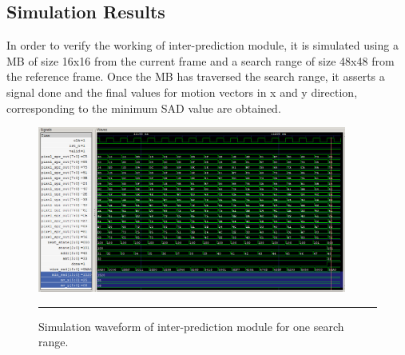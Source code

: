\subsection{Simulation Results}
In order to verify the working of inter-prediction module, it is simulated using a MB of size 16x16 from the current frame and a search range of size 48x48 from the reference frame. Once the MB has traversed the search range, it asserts a signal done and the final values for motion vectors in x and y direction, corresponding to the minimum SAD value are obtained. 
\begin{figure}[H]
	\centering
	\includegraphics[width = 4in]{./Figures/wave2.png}
	\rule{35em}{0.5pt}
	\caption{Simulation waveform of inter-prediction module for one search range.}
	\label{fig:wave2}
\end{figure}